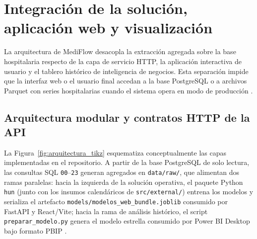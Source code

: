 
\section{Integración de la solución, aplicación web y visualización}

La arquitectura de MediFlow desacopla la extracción agregada sobre la base hospitalaria respecto de la capa de servicio HTTP, la aplicación interactiva de usuario y el tablero histórico de inteligencia de negocios. Esta separación impide que la interfaz web o el usuario final accedan a la base PostgreSQL o a archivos Parquet con series hospitalarias cuando el sistema opera en modo de producción \parencite{mediflow2026informe}.

\subsection{Arquitectura modular y contratos HTTP de la API}

La Figura~\ref{fig:arquitectura_tikz} esquematiza conceptualmente las capas implementadas en el repositorio. A partir de la base PostgreSQL de solo lectura, las consultas SQL \texttt{00}--\texttt{23} generan agregados en \texttt{data/raw/}, que alimentan dos ramas paralelas: hacia la izquierda de la solución operativa, el paquete Python \texttt{hun} (junto con los insumos calendáricos de \texttt{src/external/}) entrena los modelos y serializa el artefacto \texttt{models/modelos\_web\_bundle.joblib} consumido por FastAPI y React/Vite; hacia la rama de análisis histórico, el script \texttt{preparar\_modelo.py} genera el modelo estrella consumido por Power BI Desktop bajo formato PBIP \parencite{mediflow2026informe,mediflow2026pbip}.

